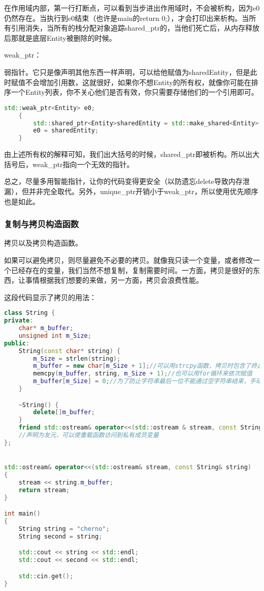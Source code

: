 在作用域内部，第一行打断点，可以看到当步进出作用域时，不会被析构，因为{\ncodestyle e0}仍然存在。当执行到{\ncodestyle e0}结束（也许是main的return 0;），才会打印出来析构。当所有引用消失，当所有的栈分配对象追踪{\ncodestyle shared_ptr}的，当他们死亡后，从内存释放后那就是底层{\ncodestyle Entity}被删除的时候。


{\ncodestyle weak_ptr}：

弱指针。它只是像声明其他东西一样声明，可以给他赋值为{\ncodestyle sharedEntity}，但是此时赋值不会增加引用数，这就很好，如果你不想{\ncodestyle Entity}的所有权，就像你可能在排序一个{\ncodestyle Entity}列表，你不关心他们是否有效，你只需要存储他们的一个引用即可。


\begin{lstlisting}[language=c++]
    std::weak_ptr<Entity> e0;
    {
        std::shared_ptr<Entity>sharedEntity = std::make_shared<Entity>();
        e0 = sharedEntity;
    }
\end{lstlisting}

由上述所有权的解释可知，我们出大括号的时候，{\ncodestyle shared_ptr}即被析构。所以出大括号后，{\ncodestyle weak_ptr}指向一个无效的指针。

总之，尽量多用智能指针，让你的代码变得更安全（以防遗忘delete导致内存泄漏），但并非完全取代。另外，{\ncodestyle unique_ptr}开销小于{\ncodestyle weak_ptr}，所以使用优先顺序也是如此。

\subsubsection{复制与拷贝构造函数}

拷贝以及拷贝构造函数。

如果可以避免拷贝，则尽量避免不必要的拷贝。就像我只读一个变量，或者修改一个已经存在的变量，我们当然不想复制，复制需要时间。一方面，拷贝是很好的东西，让事情根据我们想要的来做，另一方面，拷贝会浪费性能。

这段代码显示了拷贝的用法：

\begin{lstlisting}[language=c++]
class String {
private:
    char* m_buffer;
    unsigned int m_Size;
public:
    String(const char* string) {
        m_Size = strlen(string);
        m_buffer = new char[m_Size + 1];//可以用strcpy函数，拷贝时包含了终止字符串
        memcpy(m_buffer, string, m_Size + 1);//也可以用for循环来依次赋值
        m_buffer[m_Size] = 0;//为了防止字符串最后一位不能通过空字符串结束，手动添加最后一位
    }

    ~String() {
        delete[]m_buffer;
    }
    friend std::ostream& operator<<(std::ostream & stream, const String & string);
    //声明为友元，可以使重载函数访问到私有成员变量
};


std::ostream& operator<<(std::ostream& stream, const String& string)
{
    stream << string.m_buffer;
    return stream;
}

int main()
{
    String string = "cherno";
    String second = string;

    std::cout << string << std::endl;
    std::cout << second << std::endl;

    std::cin.get();
}
\end{lstlisting}

